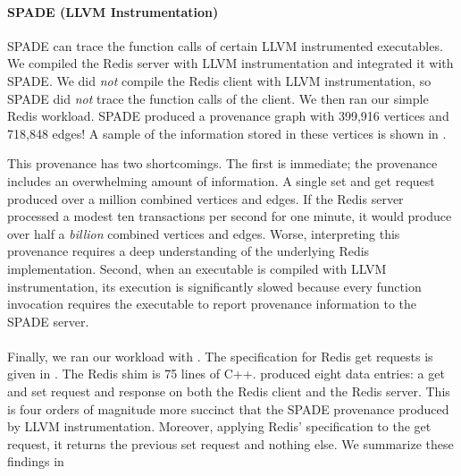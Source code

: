 \paragraph{SPADE (LLVM Instrumentation)}
SPADE can trace the function calls of certain LLVM instrumented executables. We
compiled the Redis server with LLVM instrumentation and integrated it with
SPADE. We did \emph{not} compile the Redis client with LLVM instrumentation, so
SPADE did \emph{not} trace the function calls of the client. We then ran our
simple Redis workload. SPADE produced a provenance graph with 399,916 vertices
and 718,848 edges! A sample of the information stored in these vertices is
shown in .

This provenance has two shortcomings. The first is immediate; the provenance
includes an overwhelming amount of information. A single set and get request
produced over a million combined vertices and edges. If the Redis server
processed a modest ten transactions per second for one minute, it would produce
over half a \emph{billion} combined vertices and edges. Worse, interpreting
this provenance requires a deep understanding of the underlying Redis
implementation. Second, when an executable is compiled with LLVM
instrumentation, its execution is significantly slowed because every function
invocation requires the executable to report provenance information to the
SPADE server.

\paragraph{\fluent{}}
Finally, we ran our workload with \fluent{}. The \fluent{} \watprovenance{}
specification for Redis get requests is given in
. The Redis shim is 75 lines of C++.  \fluent{}
produced eight data entries: a get and set request and response on both the
Redis client and the Redis server. This is four orders of magnitude more
succinct that the SPADE provenance produced by LLVM instrumentation. Moreover,
applying Redis' \watprovenance{} specification to the get request, it returns
the previous set request and nothing else. We summarize these findings in

